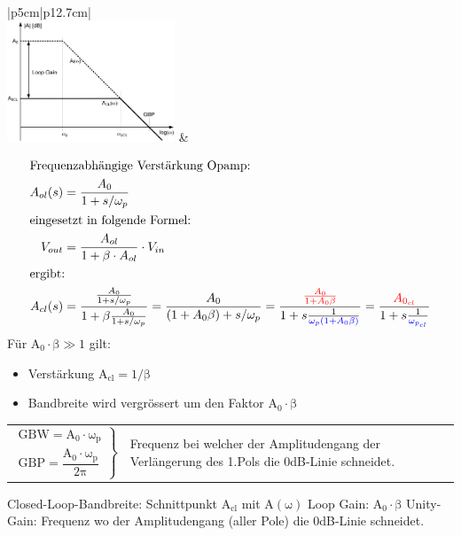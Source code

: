 \begin{longtable}[t]{|p{5cm}|p{12.7cm}|}
    \hline  
    \\ \hdashline
    \includegraphics[width=5cm, valign=t]{pictures/ClosedLoopFreqGang.png}
    & {\vspace{-1.5\topsep}
        \begin{align*}
            \intertext{Frequenzabhängige Verstärkung Opamp:}
            A_{ol}(s) &= \frac{A_0}{1 + s/\omega_p}\\
            \intertext{eingesetzt in folgende Formel:}
            V_{out} &= \frac{A_{ol}}{1 + \beta \cdot A_{ol}} \cdot V_{in}\\
            \intertext{ergibt:}
            A_{cl}(s) &= \frac{\frac{A_0}{1 + s/\omega_p}}{1 + \beta \frac{A_0}{1 + s/\omega_p}} = 
            \frac{A_0}{(1 + A_0 \beta) + s/\omega_p} = 
            \frac{\textcolor{red}{\frac{A_0}{1 + A_0 \beta}}}{1 + s \frac{1}
            {\textcolor{blue}{\omega_p(1 + A_0 \beta)}}} = 
            \frac{\textcolor{red}{A_{0_{cl}}}}{1 + s\frac{1}{\textcolor{blue}{\omega_{p_{cl}}}}}
        \end{align*}
        \newline
        Für $\mathrm{A_0 \cdot \beta \gg 1}$ gilt:\newline
        \vspace{-1.5\topsep}
        \begin{itemize}[leftmargin=*]
            \item Verstärkung $\mathrm{A_{cl} = 1/\beta}$
            \item Bandbreite wird vergrössert um den Faktor $\mathrm{A_0 \cdot\beta}$
            \newline
        \end{itemize}
        \begin{tabular}{lp{8cm}}
          $\left.\begin{matrix}
            \mathrm{GBW = A_0 \cdot \omega_p}\\
            \mathrm{GBP = \dfrac{A_0 \cdot \omega_p}{2\pi}}
          \end{matrix}\right\rbrace$ &
          Frequenz bei welcher der Amplitudengang der Verlängerung des 1.Pols die 0dB-Linie schneidet.
        \end{tabular} \newline
        Closed-Loop-Bandbreite: Schnittpunkt $\mathrm{A_{cl}}$ mit $\mathrm{A(\omega)}$\newline
        Loop Gain: $\mathrm{A_0 \cdot \beta}$ \newline
        Unity-Gain: Frequenz wo der Amplitudengang (aller Pole) die 0dB-Linie schneidet.
    }
    \\ \hline
\end{longtable}


